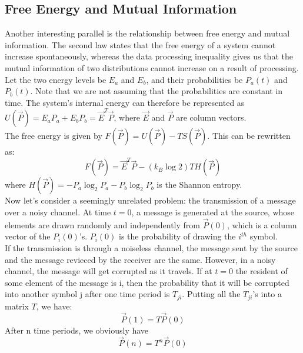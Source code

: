 \documentclass[letterpaper,10pt,english]{article}
\begin{document}
\subsection{Free Energy and Mutual Information}
Another interesting parallel is the relationship between free energy and mutual information. The second law states that the free energy of a system cannot increase spontaneously, whereas the data processing inequality gives us that the mutual information of two distributions cannot increase on a result of processing. \\
Let the two energy levels be $E_a$ and $E_b$, and their probabilities be $P_a(t)$ and $P_b(t)$. Note that we are not assuming that the probabilities are constant in time. The system's internal energy can therefore be represented as $U(\vec{P})=E_a P_a+E_b P_b=\vec{E}^{T} \vec{P}$, where $\vec{E}$ and $\vec{P}$ are column vectors. \\
The free energy is given by $F(\vec{P})=U(\vec{P})-TS(\vec{P})$. This can be rewritten as:
\begin{equation}
F(\vec{P})=\vec{E}^{T} \vec{P}- (k_B \log 2) T H(\vec{P})
\end{equation}
where $H(\vec{P})=-P_a \log_2 P_a -P_b \log_2 P_b$ is the Shannon entropy. \\
Now let's consider a seemingly unrelated problem: the transmission of a message over a noisy channel. At time $t=0$, a message is generated at the source, whose elements are drawn randomly and independently from $\vec{P}(0)$, which is a column vector of the $P_i (0)$'s. $P_i (0)$ is the probability of drawing the $i^{th}$ symbol. \\
If the transmission is through a noiseless channel, the message sent by the source and the message revieced by the receiver are the same. However, in a noisy channel, the message will get corrupted as it travels. If at $t=0$ the resident of some element of the message is i, then the probability that it will be corrupted into another symbol j after one time period is $T_{ji}$. Putting all the $T_{ji}$'s into a matrix $T$, we have:
\begin{equation*}
\vec{P}(1)=T \vec{P}(0)
\end{equation*}
After n time periods, we obviously have 
\begin{equation*}
\vec{P}(n)=T^n \vec{P}(0)
\end{equation*}
\end{document}
